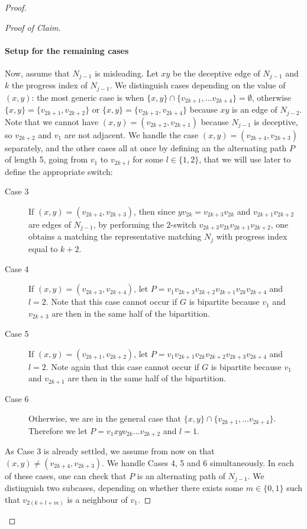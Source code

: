 \documentclass[11pt,a4paper]{article}
\theoremstyle{definition}
\newenvironment{poc}{\begin{proof}[Proof of
    Claim]\renewcommand*{\qedsymbol}{$\blacksquare$}}{\end{proof}}
\begin{document}
\begin{proof}
\begin{poc}
    \paragraph{Setup for the remaining cases}
    Now, assume that $N_{j-1}$ is misleading. Let $xy$ be the deceptive edge of
    $N_{j-1}$ and $k$ the progress index of $N_{j-1}$. We distinguish cases
    depending on the value of $(x,y)$: the most generic case is when
    $\{x,y\} \cap \{v_{2k+1}, \dots v_{2k+4}\} = \emptyset$, otherwise
    $\{x,y\} = \{v_{2k+1},v_{2k+2}\}$ or $\{x,y\} = \{v_{2k+3},v_{2k+4}\}$
    because $xy$ is an edge of $N_{j-2}$. Note that we cannot have
    $(x,y) = (v_{2k+2}, v_{2k+1})$ because $N_{j-1}$ is deceptive, so $v_{2k+2}$
    and $v_1$ are not adjacent. We handle the case
    $(x,y) = (v_{2k+4}, v_{2k+3})$ separately, and the other cases all at once
    by defining an the alternating path $P$ of length 5, going from $v_1$ to
    $v_{2k+l}$ for some $l \in \{1,2\}$, that we will use later to define the
    appropriate switch:
   \begin{description}
   \item[Case 3] If $(x,y) = (v_{2k+4}, v_{2k+3})$, then since
     $yv_{2k} = v_{2k+3}v_{2k}$ and $v_{2k+1}v_{2k+2}$ are edges of $N_{j-1}$,
     by performing the $2$-switch $v_{2k+3}v_{2k}v_{2k+1}v_{2k+2}$, one obtains a
     matching the representative matching $N_j$ with progress index equal to
     $k+2$.
   \item[Case 4] If $(x,y) = (v_{2k+3}, v_{2k+4})$, let
     $P = v_1v_{2k+3}v_{2k+2}v_{2k+1}v_{2k}v_{2k+4}$ and $l=2$. Note that this case
     cannot occur if $G$ is bipartite because $v_1$ and $v_{2k+3}$ are then in the
     same half of the bipartition.
   \item[Case 5] If $(x,y) = (v_{2k+1}, v_{2k+2})$, let
     $P = v_1v_{2k+1}v_{2k}v_{2k+2}v_{2k+3}v_{2k+4}$ and $l=2$. Note again that this
     case cannot occur if $G$ is bipartite because $v_1$ and $v_{2k+1}$ are then in the
     same half of the bipartition.
    \item[Case 6] Otherwise, we are in the general case that $\{x,y\}
    \cap \{v_{2k+1}, \dots v_{2k+4}\}$. Therefore we let $P = v_1xyv_{2k}\dots v_{2k+2}$ and
    $l=1$.
    \end{description}

    As Case 3 is already settled, we assume from now on that
    $(x,y) \neq (v_{2k+4}, v_{2k+3})$. We handle Cases 4, 5 and 6
    simultaneously. In each of these cases, one can check that $P$ is an
    alternating path of $N_{j-1}$. We distinguish two subcases, depending on
    whether there exists some $m \in \{0,1\}$ such that $v_{2(k+l+m)}$ is a
    neighbour of $v_1$.


\end{poc}
\end{proof}
\end{document}
